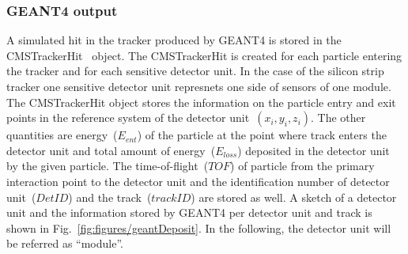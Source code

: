 




\subsubsection{GEANT4 output~\label{sec:G4out}}

A simulated hit in the tracker produced by GEANT4 is stored in the CMSTrackerHit~\cite{Lefebure:1364020} object. The CMSTrackerHit is created for each particle entering the tracker and for each sensitive detector unit. In the case of the silicon strip tracker one sensitive detector unit represnets one side of sensors of one module. The CMSTrackerHit object stores the information on the particle entry and exit points in the reference system of the detector unit~$(x_{i}, y_{i}, z_{i})$. The other quantities are energy~($E_{ent}$) of the particle at the point where track enters the detector unit and total amount of energy~($E_{loss}$) deposited in the detector unit by the given particle. The time-of-flight~($TOF$) of particle from the primary interaction point to the detector unit and the identification number of detector unit~($DetID$) and the track~($trackID$) are stored as well. A sketch of a detector unit and the information stored by GEANT4 per detector unit and track is shown in Fig.~\ref{fig:figures/geantDeposit}. In the following, the detector unit will be referred as ``module''.

